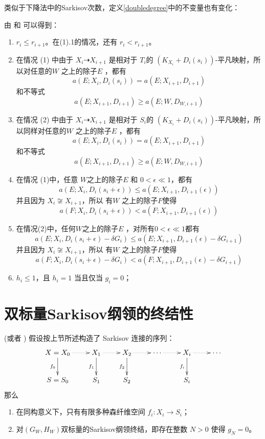 类似于下降法中的Sarkisov次数，定义\ref{doubledegree}中的不变量也有变化：
\begin{assertion}\label{behavior2}
  由 \cite[Lemma 13.14-17]{haconMinimalModelProgram2012} 和 \cite[Lemma 4.2]{liuSarkisovProgramGeneralized2021}可以得到：
  \begin{enumerate}
    \item $r_{i}\leqslant r_{i+1}$。在(1).1的情况，还有 $r_{i}<r_{i+1}$。
    \item 在情况 (1) 中由于 $X_{i}\dashrightarrow X_{i+1}$ 是相对于 $T_{i}$的 $(K_{X_{i}}+D_{i}(s_{i}))$-平凡映射，所以对任意的$W$ 之上的除子$E$ ，都有
      \[a(E;X_{i},D_{i}(s_{i}))= a(E;X_{i+1},D_{i+1})\]
      和不等式
      \[ a(E;X_{i+1},D_{i+1})\geqslant a(E;W,D_{W,i+1}) \]
    \item 在情况 (2) 中由于 $X_{i}\dashrightarrow X_{i+1}$ 是相对于 $S_{i}$的 $(K_{X_{i}}+D_{i}(s_{i}))$-平凡映射，所以同样对任意的$W$ 之上的除子$E$ ，都有
      \[a(E;X_{i},D_{i}(s_{i}))= a(E;X_{i+1},D_{i+1})\]
      和不等式
      \[ a(E;X_{i+1},D_{i+1})\geqslant a(E;W,D_{W,i+1}) \]
    \item\label{2adicrepancy} 在情况 (1)中，任意 $W$之上的除子$E$ 和 $0<\epsilon\ll 1$，都有
      \[a(E;X_{i},D_{i}(s_{i}+\epsilon))\leqslant a(E;X_{i+1},D_{i+1}(\epsilon))\] 
      并且因为 $X_{i} \not\cong X_{i+1}$，所以 有$W$ 之上的除子$F$使得 
      \[a(F;X_{i},D_{i}(s_{i}+\epsilon))< a(F;X_{i+1},D_{i+1}(\epsilon))\]
    \item\label{2bdiscrepancy} 在情况(2)中，任何$ W$之上的除子$E$ ，对所有$0<\epsilon\ll 1$都有
      \[a(E;X_{i},D_{i}(s_{i}+\epsilon)-\delta G_{i})\leqslant a(E;X_{i+1},D_{i+1}(\epsilon)-\delta G_{i+1})\]
      并且因为 $X_{i} \not\cong X_{i+1}$，所以 有$W$ 之上的除子$F$使得 
      \[a(F;X_{i},D_{i}(s_{i}+\epsilon)-\delta G_{i})< a(F;X_{i+1},D_{i+1}(\epsilon)-\delta G_{i+1}) \]
    \item  $h_{i}\leqslant 1$，且 $h_{i}=1$ 当且仅当 $g_{i}=0$；
  \end{enumerate}
\end{assertion}

\section{双标量Sarkisov纲领的终结性}
\begin{lemma}\label{termination2}
  \cite[Lemma 13.18-19]{haconMinimalModelProgram2012} (或者 \cite[Lemma 4.9]{liuSarkisovProgramGeneralized2021}) 假设按上节所述构造了 Sarkisov 连接的序列：
  \[ \xymatrix{
    X=X_0\ar@{.>}[r]\ar[d]_{f_0}&X_{1}\ar@{.>}[r]\ar[d]_{f_1}& X_{2}\ar[d]_{f_2}\ar@{.>}[r] &\cdots\ar@{.>}[r]&X_{i}\ar[d]_{f_i}\ar@{.>}[r] &\cdots\\
    S=S_{0}&S_{1} &S_{2}&&S_{i}
    } \]
  那么
  \begin{enumerate}
    \item 在同构意义下，只有有限多种森纤维空间 $f_{i}:X_{i}\to S_{i}$；
    \item 对$(G_{W},H_{W})$双标量的Sarkisov纲领终结，即存在整数 $N>0$ 使得 $g_{N}=0$。
  \end{enumerate}
\end{lemma}

